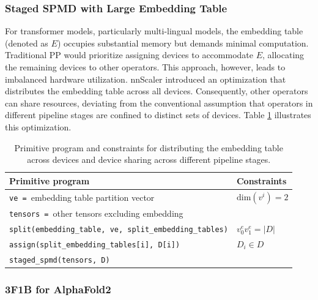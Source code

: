 \subsubsection{Staged SPMD with Large Embedding Table}

For transformer models, particularly multi-lingual models\cite{raffel2020exploring}, the embedding table (denoted as $E$) occupies substantial memory but demands minimal computation. Traditional PP would prioritize assigning devices to accommodate $E$, allocating the remaining devices to other operators. This approach, however, leads to imbalanced hardware utilization. nnScaler introduced an optimization that distributes the embedding table across all devices. Consequently, other operators can share resources, deviating from the conventional assumption that operators in different pipeline stages are confined to distinct sets of devices. Table \ref{tab:embedding} illustrates this optimization.

\begin{table}[h]
\centering
\footnotesize
\begin{tabular}{l|l}
\textbf{Primitive program} & \textbf{Constraints} \\
\hline
\texttt{ve = }embedding table partition vector & $\mathrm{dim}(v^i) = 2$ \\
\texttt{tensors = }other tensors excluding embedding& \\
\hline
\texttt{split(embedding\_table, ve, split\_embedding\_tables)} & $v^e_0 v^e_1 = |D|$ \\
\texttt{assign(split\_embedding\_tables[i], D[i])} & $D_i \in D$ \\
\hline
\texttt{staged\_spmd(tensors, D)} & \\
\hline
\end{tabular}
\caption{Primitive program and constraints for distributing the embedding table across devices and device sharing across different pipeline stages.}
\label{tab:embedding}
\end{table}

\subsubsection{3F1B for AlphaFold2}

